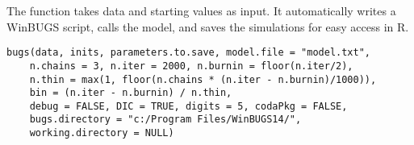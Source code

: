 \begin{Description}\relax
The  function takes data and starting values as input.
It automatically writes a WinBUGS script, calls the model,
and saves the simulations for easy access in R.
\end{Description}
\begin{Usage}
\begin{verbatim}
bugs(data, inits, parameters.to.save, model.file = "model.txt",
    n.chains = 3, n.iter = 2000, n.burnin = floor(n.iter/2),
    n.thin = max(1, floor(n.chains * (n.iter - n.burnin)/1000)),
    bin = (n.iter - n.burnin) / n.thin,
    debug = FALSE, DIC = TRUE, digits = 5, codaPkg = FALSE,
    bugs.directory = "c:/Program Files/WinBUGS14/",
    working.directory = NULL)
\end{verbatim}
\end{Usage}
